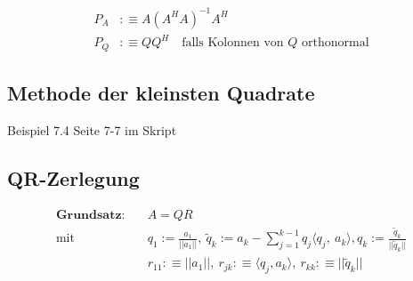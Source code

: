 \documentclass[11pt]{article}
\begin{document}
\begin{equation*}
\begin{split}
	P_A & :\equiv A(A^HA)^{-1}A^H \\
	P_Q & :\equiv QQ^H\quad\text{falls Kolonnen von $Q$ orthonormal}
\end{split}
\end{equation*}

\subsection{Methode der kleinsten Quadrate}

Beispiel 7.4 Seite 7-7 im Skript

\subsection{QR-Zerlegung}

\begin{equation*}
\begin{split}
	\textbf{Grundsatz:} & \quad A = QR \\
	\text{mit} & \quad q_1 := \frac{a_1}{||a_1||},\ \tilde q_k := a_k - \sum_{j=1}^{k-1}q_j \langle q_j,\ a_k \rangle, q_k := \frac{\tilde q_k}{||\tilde q_k||} \\
	& \quad r_{11} :\equiv ||a_1||,\ r_{jk} :\equiv \langle q_j, a_k \rangle,\ r_{kk} :\equiv ||\tilde q_k||
\end{split}
\end{equation*}
\end{document}
